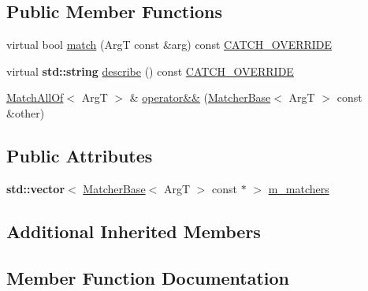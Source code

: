 \subsection*{Public Member Functions}
\begin{DoxyCompactItemize}
\item 
virtual bool \hyperlink{struct_catch_1_1_matchers_1_1_impl_1_1_match_all_of_a7bf0c2d8cedf67ecf9d0a527cb5a8263}{match} (ArgT const \&arg) const \hyperlink{catch_8hpp_a8ecdce4d3f57835f707915ae831eb847}{C\+A\+T\+C\+H\+\_\+\+O\+V\+E\+R\+R\+I\+DE}
\item 
virtual \textbf{ std\+::string} \hyperlink{struct_catch_1_1_matchers_1_1_impl_1_1_match_all_of_aaefeba99a0b35425203468a65bff544b}{describe} () const \hyperlink{catch_8hpp_a8ecdce4d3f57835f707915ae831eb847}{C\+A\+T\+C\+H\+\_\+\+O\+V\+E\+R\+R\+I\+DE}
\item 
\hyperlink{struct_catch_1_1_matchers_1_1_impl_1_1_match_all_of}{Match\+All\+Of}$<$ ArgT $>$ \& \hyperlink{struct_catch_1_1_matchers_1_1_impl_1_1_match_all_of_a9d0e38b36474336498d627610db434f3}{operator\&\&} (\hyperlink{struct_catch_1_1_matchers_1_1_impl_1_1_matcher_base}{Matcher\+Base}$<$ ArgT $>$ const \&other)
\end{DoxyCompactItemize}
\subsection*{Public Attributes}
\begin{DoxyCompactItemize}
\item 
\textbf{ std\+::vector}$<$ \hyperlink{struct_catch_1_1_matchers_1_1_impl_1_1_matcher_base}{Matcher\+Base}$<$ ArgT $>$ const  $\ast$ $>$ \hyperlink{struct_catch_1_1_matchers_1_1_impl_1_1_match_all_of_a98d6a2611f195a4a5c49f92fd877be9a}{m\+\_\+matchers}
\end{DoxyCompactItemize}
\subsection*{Additional Inherited Members}


\subsection{Member Function Documentation}
\mbox{\label{struct_catch_1_1_matchers_1_1_impl_1_1_match_all_of_aaefeba99a0b35425203468a65bff544b}} 
